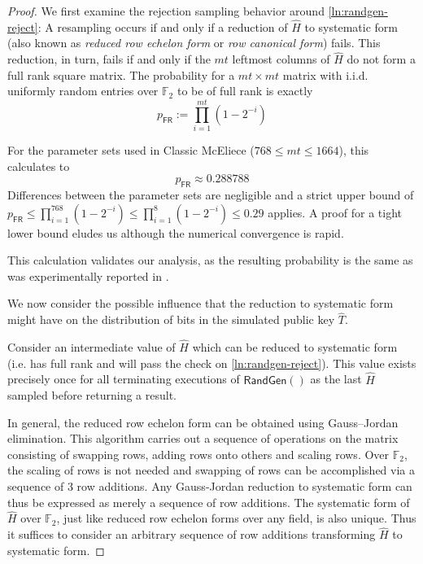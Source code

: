 \begin{proof}
    We first examine the rejection sampling behavior around \cref{ln:randgen-reject}: A resampling occurs if and only if a reduction of $\hat H$ to systematic form (also known as \emph{reduced row echelon form} or \emph{row canonical form}) fails. This reduction, in turn, fails if and only if the $mt$ leftmost columns of $\hat H$ do not form a full rank square matrix.
    The probability for a $mt \times mt$ matrix with i.i.d. uniformly random entries over $\mathbb F_2$ to be of full rank is exactly \cite{DBLP:journals/corr/SalmondGGC14}
    \[ p_\mathsf{FR} := \prod_{i=1}^{mt} \left( 1-2^{-i} \right) \]
    
    For the parameter sets used in Classic McEliece ($768 \leq mt \leq 1664$), this calculates to \[ p_\mathsf{FR} \approx 0.288788 \]
    Differences between the parameter sets are negligible and a strict upper bound of $p_\mathsf{FR} \leq \prod_{i=1}^{768} \left( 1-2^{-i} \right) \leq \prod_{i=1}^{8} \left( 1-2^{-i} \right) \leq 0.29$ applies. A proof for a tight lower bound eludes us although the numerical convergence is rapid.
    
    This calculation validates our analysis, as the resulting probability is the same as was experimentally reported in \cite[security.pdf: Section 4.2]{NISTPQC-R4:ClassicMcEliece22}.
    
    We now consider the possible influence that the reduction to systematic form might have on the distribution of bits in the simulated public key $\hat T$.

    Consider an intermediate value of $\hat H$ which can be reduced to systematic form (i.e. has full rank and will pass the check on \cref{ln:randgen-reject}). This value exists precisely once for all terminating executions of $\textsf{RandGen}()$ as the last $\hat H$ sampled before returning a result.

    In general, the reduced row echelon form can be obtained using Gauss–Jordan elimination. This algorithm carries out a sequence of operations on the matrix consisting of swapping rows, adding rows onto others and scaling rows.
    Over $\mathbb F_2$, the scaling of rows is not needed and swapping of rows can be accomplished via a sequence of 3 row additions. Any Gauss-Jordan reduction to systematic form can thus be expressed as merely a sequence of row additions.
    The systematic form of $\hat H$ over $\mathbb F_2$, just like reduced row echelon forms over any field, is also unique. Thus it suffices to consider an arbitrary sequence of row additions transforming $\hat H$ to systematic form.
    

\end{proof}
